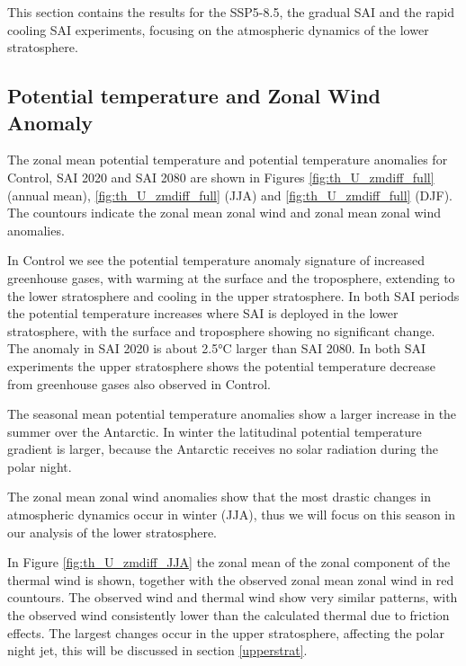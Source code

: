 This section contains the results for the SSP5-8.5, the gradual SAI and the rapid cooling SAI experiments, focusing on the atmospheric dynamics of the lower stratosphere.

\subsection{Potential temperature and Zonal Wind Anomaly}
The zonal mean potential temperature and potential temperature anomalies for Control, SAI 2020 and SAI 2080 are shown in Figures \ref{fig:th_U_zmdiff_full} (annual mean), \ref{fig:th_U_zmdiff_full} (JJA) and \ref{fig:th_U_zmdiff_full} (DJF). The countours indicate the zonal mean zonal wind and zonal mean zonal wind anomalies. 

In Control we see the potential temperature anomaly signature of increased greenhouse gases, with warming at the surface and the troposphere, extending to the lower stratosphere and cooling in the upper stratosphere. In both SAI periods the potential temperature increases where SAI is deployed in the lower stratosphere, with the surface and troposphere showing no significant change. The anomaly in SAI 2020 is about 2.5°C larger than SAI 2080. In both SAI experiments the upper stratosphere shows the potential temperature decrease from greenhouse gases also observed in Control. 

The seasonal mean potential temperature anomalies show a larger increase in the summer over the Antarctic. In winter the latitudinal potential temperature gradient is larger, because the Antarctic receives no solar radiation during the polar night. 

The zonal mean zonal wind anomalies show that the most drastic changes in atmospheric dynamics occur in winter (JJA), thus we will focus on this season in our analysis of the lower stratosphere.

In Figure \ref{fig:th_U_zmdiff_JJA} the zonal mean of the zonal component of the thermal wind is shown, together with the observed zonal mean zonal wind in red countours. The observed wind and thermal wind show very similar patterns, with the observed wind consistently lower than the calculated thermal due to friction effects. The largest changes occur in the upper stratosphere, affecting the polar night jet, this will be discussed in section \ref{upperstrat}. 


